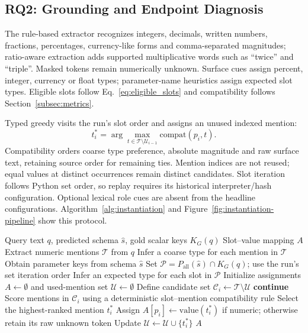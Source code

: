 \documentclass[pdflatex,iicol,sn-basic,Numbered]{sn-jnl}
\begin{document}
\subsection{RQ2: Grounding and Endpoint Diagnosis}
\label{subsec:method_instantiation}\label{subsec:method_design}
The rule-based extractor recognizes integers, decimals, written numbers, fractions, percentages, currency-like forms and comma-separated magnitudes; ratio-aware extraction adds supported multiplicative words such as ``twice'' and ``triple''. Masked tokens remain numerically unknown. Surface cues assign percent, integer, currency or float types; parameter-name heuristics assign expected slot types. Eligible slots follow Eq.~\eqref{eq:eligible_slots} and compatibility follows Section~\ref{subsec:metrics}.

Typed greedy visits the run's slot order and assigns an unused indexed mention:
\begin{equation}
t_i^*=\arg\max_{t\in\mathcal T\setminus\mathcal U_{i-1}}\mathrm{compat}(p_i,t).
\label{eq:typed_assignment}
\end{equation}
Compatibility orders coarse type preference, absolute magnitude and raw surface text, retaining source order for remaining ties. Mention indices are not reused; equal values at distinct occurrences remain distinct candidates. Slot iteration follows Python set order, so replay requires its historical interpreter/hash configuration. Optional lexical role cues are absent from the headline configurations. Algorithm~\ref{alg:instantiation} and Figure~\ref{fig:instantiation-pipeline} show this protocol.

\begin{algorithm*}[t]
\caption{Deterministic parameter instantiation: extract and type mentions; intersect predicted parameter keys with gold scalar keys; assign without token reuse under a deterministic compatibility rule.}
\label{alg:instantiation}
\small
\begin{algorithmic}[1]
\Require Query text $q$, predicted schema $\hat{s}$, gold scalar keys $K_G(q)$
\Ensure Slot--value mapping $A$
\State Extract numeric mentions $\mathcal{T}$ from $q$
\State Infer a coarse type for each mention in $\mathcal{T}$
\State Obtain parameter keys from schema $\hat{s}$
\State Set $\mathcal{P}=P_{\mathrm{all}}(\hat{s})\cap K_G(q)$; use the run's set iteration order
\State Infer an expected type for each slot in $\mathcal{P}$
\State Initialize assignments $A \leftarrow \emptyset$ and used-mention set $\mathcal{U}\leftarrow \emptyset$
    \State Define candidate set $\mathcal{C}_i \leftarrow \mathcal{T} \setminus \mathcal{U}$
        \State \textbf{continue}
    \EndIf
    \State Score mentions in $\mathcal{C}_i$ using a deterministic slot--mention compatibility rule
    \State Select the highest-ranked mention $t_i^{*}$
    \State Assign $A[p_i] \leftarrow \mathrm{value}(t_i^{*})$ if numeric; otherwise retain its raw unknown token
    \State Update $\mathcal{U} \leftarrow \mathcal{U} \cup \{t_i^{*}\}$
\EndFor
\State \Return $A$
\end{algorithmic}
\end{algorithm*}
\end{document}
